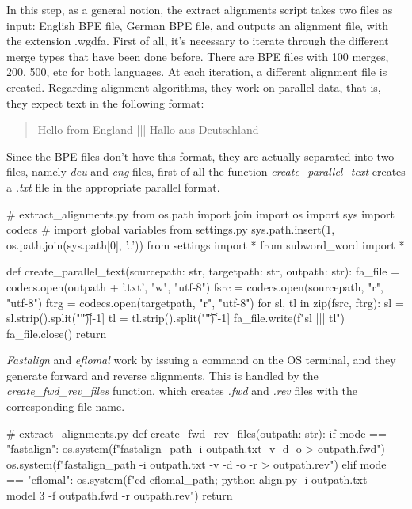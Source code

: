 In this step, as a general notion, the extract alignments script takes two files as input: English BPE file, German BPE file, and outputs an alignment file, with the extension .wgdfa. First of all, it's necessary to iterate through the different merge types that have been done before. There are BPE files with 100 merges, 200, 500, etc for both languages. At each iteration, a different alignment file is created. Regarding alignment algorithms, they work on parallel data, that is, they expect text in the following format:

\begin{quote}
  Hello from England ||| Hallo aus Deutschland
\end{quote}

Since the BPE files don't have this format, they are actually separated into two files, namely \emph{deu} and \emph{eng} files, first of all the function \emph{create\_parallel\_text} creates a \emph{.txt} file in the appropriate parallel format.

\begin{python}
# extract_alignments.py
from os.path import join
import os
import sys
import codecs
# import global variables from settings.py
sys.path.insert(1, os.path.join(sys.path[0], '..'))
from settings import *
from subword_word import *

def create_parallel_text(sourcepath: str, targetpath: str, outpath: str):
  fa_file = codecs.open(outpath + '.txt', "w", "utf-8")
  fsrc = codecs.open(sourcepath, "r", "utf-8")
  ftrg = codecs.open(targetpath, "r", "utf-8")
  for sl, tl in zip(fsrc, ftrg):
    sl = sl.strip().split("\t")[-1]
    tl = tl.strip().split("\t")[-1]
    fa_file.write(f"{sl} ||| {tl}\n")
  fa_file.close()
  return
\end{python}

\emph{Fastalign} and \emph{eflomal} work by issuing a command on the OS terminal, and they generate forward and reverse alignments. This is handled by the \emph{create\_fwd\_rev\_files} function, which creates \emph{.fwd} and \emph{.rev} files with the corresponding file name.

\begin{python}
# extract_alignments.py
def create_fwd_rev_files(outpath: str):
  if mode == "fastalign":
    os.system(f"{fastalign_path} -i {outpath}.txt -v -d -o > {outpath}.fwd")
    os.system(f"{fastalign_path} -i {outpath}.txt -v -d -o -r > {outpath}.rev")
  elif mode == "eflomal":
    os.system(f"cd {eflomal_path}; python align.py -i {outpath}.txt --model 3 -f {outpath}.fwd -r {outpath}.rev")
  return
\end{python}

